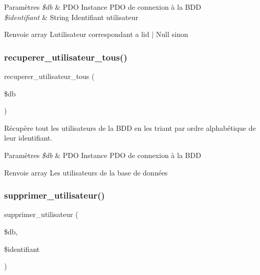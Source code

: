 \begin{DoxyParams}{Paramètres}
{\em \$db} & P\+DO Instance P\+DO de connexion à la B\+DD \\
\hline
{\em \$identifiant} & String Identifiant utilisateur \\
\hline
\end{DoxyParams}
\begin{DoxyReturn}{Renvoie}
array L\textquotesingle{}utilisateur correspondant a l\textquotesingle{}id $\vert$ Null sinon 
\end{DoxyReturn}
\mbox{\label{fonctionCompte_8php_aadbf0b64bdc685cdf00ccc9a7ee666ad}} 
\subsubsection{\texorpdfstring{recuperer\+\_\+utilisateur\+\_\+tous()}{recuperer\_utilisateur\_tous()}}
{\footnotesize\ttfamily recuperer\+\_\+utilisateur\+\_\+tous (\begin{DoxyParamCaption}\item[{}]{\$db }\end{DoxyParamCaption})}



Récupère tout les utilisateurs de la B\+DD en les triant par ordre alphabétique de leur identifiant. 


\begin{DoxyParams}{Paramètres}
{\em \$db} & P\+DO Instance P\+DO de connexion à la B\+DD \\
\hline
\end{DoxyParams}
\begin{DoxyReturn}{Renvoie}
array Les utilisateurs de la base de données 
\end{DoxyReturn}
\mbox{\label{fonctionCompte_8php_a71d9b591a6c09487582f9f51a162f8f8}} 
\subsubsection{\texorpdfstring{supprimer\+\_\+utilisateur()}{supprimer\_utilisateur()}}
{\footnotesize\ttfamily supprimer\+\_\+utilisateur (\begin{DoxyParamCaption}\item[{}]{\$db,  }\item[{}]{\$identifiant }\end{DoxyParamCaption})}



